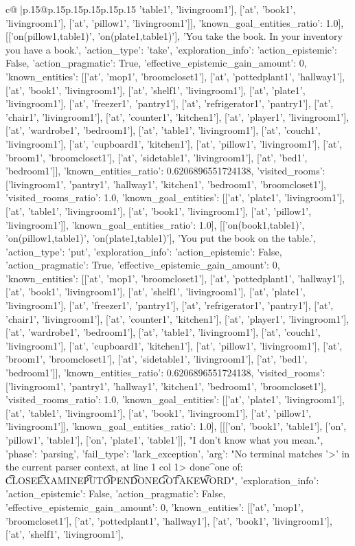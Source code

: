 \documentclass{article}
\begin{document}
{\begin{supertabular}{c@{$\;$}|p{.15\linewidth}@{}p{.15\linewidth}p{.15\linewidth}p{.15\linewidth}p{.15\linewidth}p{.15\linewidth}}
{{{'table1', 'livingroom1'], ['at', 'book1', 'livingroom1'], ['at', 'pillow1', 'livingroom1']], 'known_goal_entities_ratio': 1.0}}], [['on(pillow1,table1)', 'on(plate1,table1)'], 'You take the book. In your inventory you have a book.', {'action_type': 'take', 'exploration_info': {'action_epistemic': False, 'action_pragmatic': True, 'effective_epistemic_gain_amount': 0, 'known_entities': [['at', 'mop1', 'broomcloset1'], ['at', 'pottedplant1', 'hallway1'], ['at', 'book1', 'livingroom1'], ['at', 'shelf1', 'livingroom1'], ['at', 'plate1', 'livingroom1'], ['at', 'freezer1', 'pantry1'], ['at', 'refrigerator1', 'pantry1'], ['at', 'chair1', 'livingroom1'], ['at', 'counter1', 'kitchen1'], ['at', 'player1', 'livingroom1'], ['at', 'wardrobe1', 'bedroom1'], ['at', 'table1', 'livingroom1'], ['at', 'couch1', 'livingroom1'], ['at', 'cupboard1', 'kitchen1'], ['at', 'pillow1', 'livingroom1'], ['at', 'broom1', 'broomcloset1'], ['at', 'sidetable1', 'livingroom1'], ['at', 'bed1', 'bedroom1']], 'known_entities_ratio': 0.6206896551724138, 'visited_rooms': ['livingroom1', 'pantry1', 'hallway1', 'kitchen1', 'bedroom1', 'broomcloset1'], 'visited_rooms_ratio': 1.0, 'known_goal_entities': [['at', 'plate1', 'livingroom1'], ['at', 'table1', 'livingroom1'], ['at', 'book1', 'livingroom1'], ['at', 'pillow1', 'livingroom1']], 'known_goal_entities_ratio': 1.0}}], [['on(book1,table1)', 'on(pillow1,table1)', 'on(plate1,table1)'], 'You put the book on the table.', {'action_type': 'put', 'exploration_info': {'action_epistemic': False, 'action_pragmatic': True, 'effective_epistemic_gain_amount': 0, 'known_entities': [['at', 'mop1', 'broomcloset1'], ['at', 'pottedplant1', 'hallway1'], ['at', 'book1', 'livingroom1'], ['at', 'shelf1', 'livingroom1'], ['at', 'plate1', 'livingroom1'], ['at', 'freezer1', 'pantry1'], ['at', 'refrigerator1', 'pantry1'], ['at', 'chair1', 'livingroom1'], ['at', 'counter1', 'kitchen1'], ['at', 'player1', 'livingroom1'], ['at', 'wardrobe1', 'bedroom1'], ['at', 'table1', 'livingroom1'], ['at', 'couch1', 'livingroom1'], ['at', 'cupboard1', 'kitchen1'], ['at', 'pillow1', 'livingroom1'], ['at', 'broom1', 'broomcloset1'], ['at', 'sidetable1', 'livingroom1'], ['at', 'bed1', 'bedroom1']], 'known_entities_ratio': 0.6206896551724138, 'visited_rooms': ['livingroom1', 'pantry1', 'hallway1', 'kitchen1', 'bedroom1', 'broomcloset1'], 'visited_rooms_ratio': 1.0, 'known_goal_entities': [['at', 'plate1', 'livingroom1'], ['at', 'table1', 'livingroom1'], ['at', 'book1', 'livingroom1'], ['at', 'pillow1', 'livingroom1']], 'known_goal_entities_ratio': 1.0}}], [[['on', 'book1', 'table1'], ['on', 'pillow1', 'table1'], ['on', 'plate1', 'table1']], "I don't know what you mean.", {'phase': 'parsing', 'fail_type': 'lark_exception', 'arg': "No terminal matches '>' in the current parser context, at line 1 col 1\n\n> done\n^\nExpected one of: \n\t* CLOSE\n\t* EXAMINE\n\t* PUT\n\t* OPEN\n\t* DONE\n\t* GO\n\t* TAKE\n\t* WORD\n", 'exploration_info': {'action_epistemic': False, 'action_pragmatic': False, 'effective_epistemic_gain_amount': 0, 'known_entities': [['at', 'mop1', 'broomcloset1'], ['at', 'pottedplant1', 'hallway1'], ['at', 'book1', 'livingroom1'], ['at', 'shelf1', 'livingroom1'], }}}
\end{supertabular}}
\end{document}
